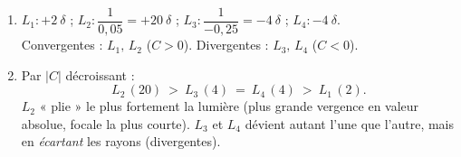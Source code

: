 \documentclass[11pt,a4paper]{article}
\begin{document}
\begin{corrige}
\begin{enumerate}[label=\alph*)]
  \item $L_1:+2~\delta$ ; $L_2: \dfrac{1}{0,05}=+20~\delta$ ; $L_3:\dfrac{1}{-0,25}=-4~\delta$ ;
        $L_4:-4~\delta$.\\
        Convergentes : $L_1,\,L_2$ ($C>0$). Divergentes : $L_3,\,L_4$ ($C<0$).
  \item Par $|C|$ décroissant :
        \[ L_2\,(20)\ >\ L_3\,(4)\ =\ L_4\,(4)\ >\ L_1\,(2). \]
        $L_2$ « plie » le plus fortement la lumière (plus grande vergence en valeur absolue, focale la
        plus courte). $L_3$ et $L_4$ dévient autant l'une que l'autre, mais en \emph{écartant} les
        rayons (divergentes).
\end{enumerate}
\end{corrige}
\end{document}

